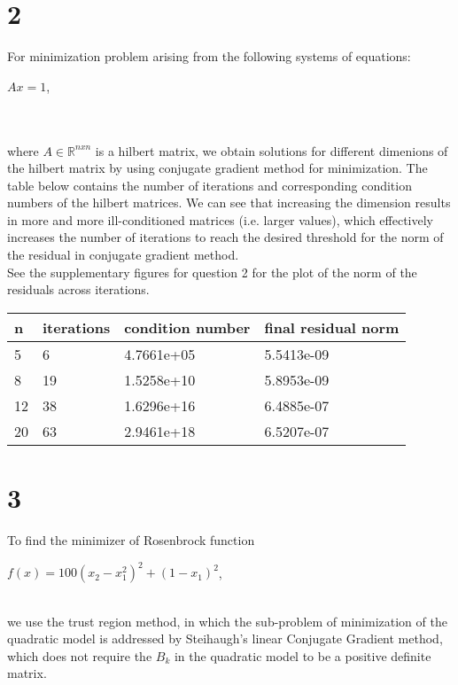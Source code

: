 \documentclass{article}
\begin{document}
\section*{2}
For minimization problem arising from the following systems of equations:\\
\begin{center} $Ax = 1$, \end{center} \\
\\
where $A \in \mathbb{R}^{nxn}$ is a hilbert matrix,  we obtain solutions for different dimenions of the hilbert matrix by using conjugate gradient method for minimization. The table below contains the number of iterations and corresponding condition numbers of the hilbert matrices. We can see that increasing the dimension results in more and more ill-conditioned matrices (i.e. larger values), which effectively increases the number of iterations to reach the desired threshold for the norm of the residual in conjugate gradient method. 
\\

See the supplementary figures for question 2 for the plot of the norm of the residuals across iterations. 
\begin{table}[h]
\begin{tabular}{|l|l|l|l|}
\hline
n  & iterations & condition number & final residual norm \\ \hline
5  & 6          & 4.7661e+05       & 5.5413e-09          \\ \hline
8  & 19         & 1.5258e+10       & 5.8953e-09          \\ \hline
12 & 38         & 1.6296e+16       & 6.4885e-07          \\ \hline
20 & 63         & 2.9461e+18       & 6.5207e-07          \\ \hline
\end{tabular}
\end{table}

\section*{3}
To find the minimizer of Rosenbrock function\\
\begin{center}
    $f (x) = 100(x_2 - x_1^2 )^2 + (1 - x_1 )^2 $,
\end{center}\\
we use the trust region method, in which the sub-problem of minimization of the quadratic model is addressed by Steihaugh's linear Conjugate Gradient method, which does not require the $B_k$ in the quadratic model to be a positive definite matrix.
\end{document}
